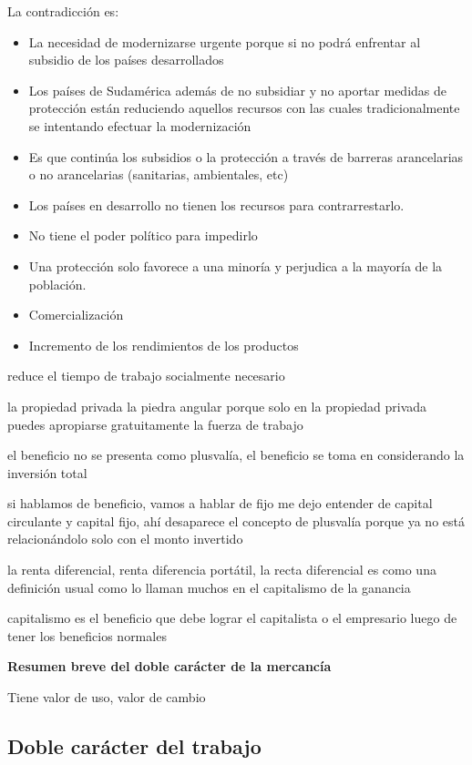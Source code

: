 \documentclass[
  a4paper,
]{article}
\providecommand{\tightlist}{%
  \setlength{\itemsep}{0pt}\setlength{\parskip}{0pt}}\usepackage{longtable,booktabs,array}
\begin{document}
La contradicción es:

\begin{itemize}
\tightlist
\item
  La necesidad de modernizarse urgente porque si no podrá enfrentar al
  subsidio de los países desarrollados
\item
  Los países de Sudamérica además de no subsidiar y no aportar medidas
  de protección están reduciendo aquellos recursos con las cuales
  tradicionalmente se intentando efectuar la modernización
\item
  Es que continúa los subsidios o la protección a través de barreras
  arancelarias o no arancelarias (sanitarias, ambientales, etc)
\item
  Los países en desarrollo no tienen los recursos para contrarrestarlo.
\item
  No tiene el poder político para impedirlo
\item
  Una protección solo favorece a una minoría y perjudica a la mayoría de
  la población.
\item
  Comercialización
\item
  Incremento de los rendimientos de los productos
\end{itemize}

reduce el tiempo de trabajo socialmente necesario

la propiedad privada la piedra angular porque solo en la propiedad
privada puedes apropiarse gratuitamente la fuerza de trabajo

el beneficio no se presenta como plusvalía, el beneficio se toma en
considerando la inversión total

si hablamos de beneficio, vamos a hablar de fijo me dejo entender de
capital circulante y capital fijo, ahí desaparece el concepto de
plusvalía porque ya no está relacionándolo solo con el monto invertido

la renta diferencial, renta diferencia portátil, la recta diferencial es
como una definición usual como lo llaman muchos en el capitalismo de la
ganancia

capitalismo es el beneficio que debe lograr el capitalista o el
empresario luego de tener los beneficios normales

\textbf{Resumen breve del doble carácter de la mercancía}

Tiene valor de uso, valor de cambio

\hypertarget{doble-caruxe1cter-del-trabajo}{%
\subsection{Doble carácter del
trabajo}\label{doble-caruxe1cter-del-trabajo}}
\end{document}
